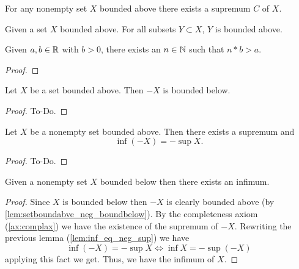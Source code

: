 \begin{axiom}\label{ax:complax}
   \leanok
  For any nonempty set $X$ bounded above there exists a supremum $C$ of $X$.
\end{axiom}

\begin{lemma}\label{lem:subsetboundbounded}
   \leanok
  Given a set $X$ bounded above.
  For all subsets $Y \subset X$,
  $Y$ is bounded above.
\end{lemma}

\begin{theorem}[Archimedes]\label{thm:archimedes}
  Given $a, b \in \mathbb{R}$ with $b > 0$,
  there exists an $n \in \mathbb{N}$ such that $n * b > a$.
\end{theorem}
\begin{proof}
\end{proof}

\begin{lemma}\label{lem:setboundabve_neg_boundbelow}
   \leanok
  Let $X$ be a set bounded above.
  Then $-X$ is bounded below.
\end{lemma}
\begin{proof}
  To-Do.
\end{proof}

\begin{lemma}\label{lem:inf_eq_neg_sup}
  Let $X$ be a nonempty set bounded above.
  Then there exists a supremum and
  \[
  \inf(-X) = -\sup{X}.
  \]
\end{lemma}
\begin{proof}
  To-Do.
\end{proof}

\begin{lemma}\label{lem:existsinfimum}
  Given a nonempty set $X$ bounded below then there exists an infimum.
\end{lemma}
\begin{proof}
  Since $X$ is bounded below then $-X$ is clearly bounded above
  (by \autoref{lem:setboundabve_neg_boundbelow}).
  By the completeness axiom
  (\autoref{ax:complax})
  we have the existence of the supremum of $-X$.
  Rewriting the previous lemma
  (\autoref{lem:inf_eq_neg_sup})
  we have
  \[
  \inf(-X) = -\sup{X} \iff \inf{X} = -\sup(-X)
  \]
  applying this fact we get.
  Thus,
  we have the infimum of $X$.
\end{proof}